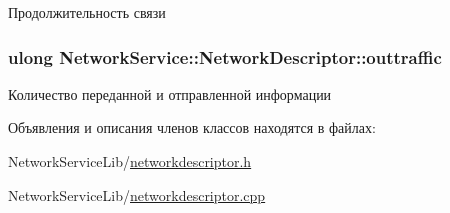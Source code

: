 Продолжительность связи 

\hypertarget{class_network_service_1_1_network_descriptor_a109969d9199b67144184e1b296406edc}{}
\subsubsection[{outtraffic}]{\setlength{\rightskip}{0pt plus 5cm}ulong Network\+Service\+::\+Network\+Descriptor\+::outtraffic\hspace{0.3cm}{\ttfamily [private]}}\label{class_network_service_1_1_network_descriptor_a109969d9199b67144184e1b296406edc}


Количество переданной и отправленной информации 



Объявления и описания членов классов находятся в файлах\+:\begin{DoxyCompactItemize}
\item 
Network\+Service\+Lib/\hyperlink{networkdescriptor_8h}{networkdescriptor.\+h}\item 
Network\+Service\+Lib/\hyperlink{networkdescriptor_8cpp}{networkdescriptor.\+cpp}\end{DoxyCompactItemize}
